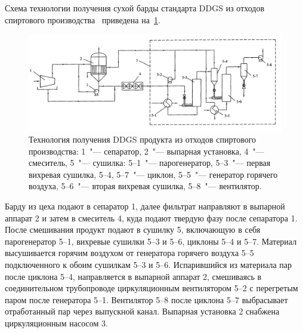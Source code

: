 Схема технологии получения сухой барды стандарта DDGS из отходов спиртового производства~\cite{CH.Device.2006} приведена на~\cref{fig:stillage_chinese}.
\begin{figure}[htb]
\centering
\includegraphics[width=\textwidth]{figures/temp/chinese.jpg}
\caption[Технология получения DDGS продукта из отходов спиртового производства]{Технология получения DDGS продукта из отходов спиртового производства:
1~"--- сепаратор, 2~"--- выпарная установка, 4~"--- смеситель, 5~"--- сушилка: 5--1~"--- парогенератор, 5--3~"--- первая вихревая сушилка, 5--4, 5--7~"--- циклон, 5--5~"--- генератор горячего воздуха, 5--6~"--- вторая вихревая сушилка, 5--8~"--- вентилятор.}\label{fig:stillage_chinese}
\end{figure}
Барду из цеха подают в сепаратор 1, далее фильтрат направляют в выпарной аппарат 2 и затем в смеситель 4, куда подают твердую фазу после сепаратора 1.
После смешивания продукт подают в сушилку 5, включающую в себя парогенератор 5--1, вихревые сушилки 5--3 и 5--6, циклоны 5--4 и 5--7.
Материал высушивается горячим воздухом от генератора горячего воздуха 5--5 подключенного к обоим сушилкам 5--3 и 5--6. 
Испарившийся из материала пар после циклона 5--4, направляется в выпарной аппарат 2, смешиваясь в соединительном трубопроводе циркуляционным вентилятором 5--2 с перегретым паром после генератора 5--1.
Вентилятор 5--8 после циклона 5--7 выбрасывает отработанный пар через выпускной канал. 
Выпарная установка 2 снабжена циркуляционным насосом 3.

